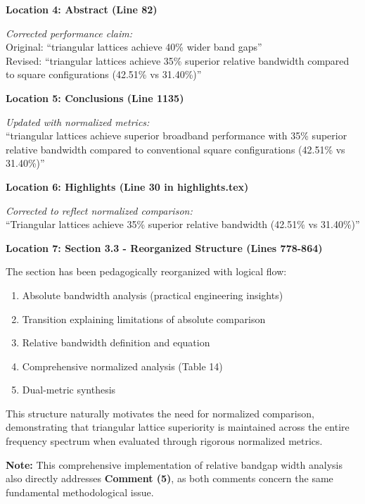 \documentclass[11pt,a4paper]{article}
\newenvironment{changesbox}{%
    \par\medskip\noindent{\color{changescolor}\rule{\linewidth}{2pt}}\par
    \noindent{\color{changescolor}\bfseries Manuscript Changes}\par\smallskip
}{%
    \par\noindent{\color{changescolor}\rule{\linewidth}{0.5pt}}\medskip
}
\begin{document}
\begin{changesbox}
\textbf{Location 4: Abstract (Line 82)}

\textit{Corrected performance claim:}\\
Original: ``triangular lattices achieve 40\% wider band gaps''\\
Revised: \textcolor{redtext}{``triangular lattices achieve 35\% superior relative bandwidth compared to square configurations (42.51\% vs 31.40\%)''}

\textbf{Location 5: Conclusions (Line 1135)}

\textit{Updated with normalized metrics:}\\
\textcolor{redtext}{``triangular lattices achieve superior broadband performance with 35\% superior relative bandwidth compared to conventional square configurations (42.51\% vs 31.40\%)''}

\textbf{Location 6: Highlights (Line 30 in highlights.tex)}

\textit{Corrected to reflect normalized comparison:}\\
\textcolor{redtext}{``Triangular lattices achieve 35\% superior relative bandwidth (42.51\% vs 31.40\%)''}

\textbf{Location 7: Section 3.3 - Reorganized Structure (Lines 778-864)}

The section has been pedagogically reorganized with logical flow:
\begin{enumerate}
    \item Absolute bandwidth analysis (practical engineering insights)
    \item Transition explaining limitations of absolute comparison
    \item Relative bandwidth definition and equation
    \item Comprehensive normalized analysis (Table 14)
    \item Dual-metric synthesis
\end{enumerate}

This structure naturally motivates the need for normalized comparison, demonstrating that triangular lattice superiority is maintained across the entire frequency spectrum when evaluated through rigorous normalized metrics.
\end{changesbox}

\textbf{Note:} This comprehensive implementation of relative bandgap width analysis also directly addresses \textbf{Comment (5)}, as both comments concern the same fundamental methodological issue.

\newpage
\end{document}
